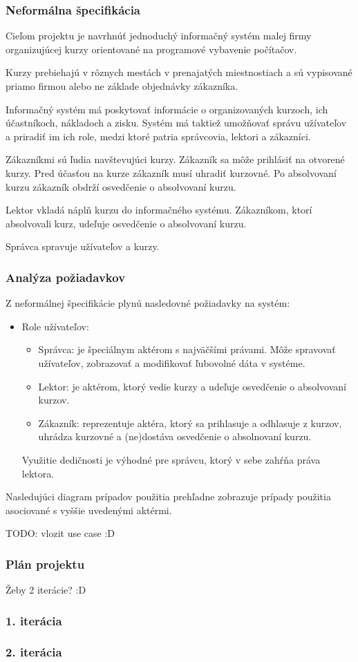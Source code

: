 \documentclass[12pt,a4paper,titlepage,final]{report}
\begin{document}
	\def\authora{Michal Riša}
	\def\authorb{Pavel Macenauer}
	\def\emaila{xrisam01@stud.fit.vutbr.cz}
	\def\emailb{xmacen02@stud.fit.vutbr.cz}
	\def\docname{Firma2}
	\def\projname{Prvotná analýza a plán projektu}
	
	\newpage
	\pagestyle{plain}
	\setcounter{page}{1}
	\subsubsection{Neformálna špecifikácia}
Cieľom projektu je navrhnúť jednoduchý informačný systém malej firmy organizujúcej kurzy orientované na programové vybavenie počítačov.

Kurzy prebiehajú v rôznych mestách v prenajatých miestnostiach a sú vypisované priamo firmou alebo ne základe objednávky zákazníka.

Informačný systém má poskytovať informácie o organizovaných kurzoch, ich účastníkoch, nákladoch a zisku. Systém má taktiež umožňovať správu užívateľov a priradiť im ich role, medzi ktoré patria správcovia, lektori a zákazníci.

Zákazníkmi sú ľudia navštevujúci kurzy. Zákazník sa môže prihlásiť na otvorené kurzy. Pred účasťou na kurze zákazník musí uhradiť kurzovné. Po absolvovaní kurzu zákazník obdrží osvedčenie o absolvovaní kurzu.

Lektor vkladá náplň kurzu do informačného systému. Zákazníkom, ktorí absolvovali kurz, udeľuje osvedčenie o absolvovaní kurzu.

Správca spravuje užívateľov a kurzy.
	\subsubsection{Analýza požiadavkov}
Z neformálnej špecifikácie plynú nasledovné požiadavky na systém:
		\begin{itemize}
			\item Role užívateľov:
			\begin{itemize}
				\item Správca: je špeciálnym aktérom s najväčšími právami. Môže spravovať užívateľov, zobrazovať a modifikovať ľubovolné dáta v systéme.
				\item Lektor: je aktérom, ktorý vedie kurzy a udeľuje osvedčenie o absolvovaní kurzov.
				\item Zákazník: reprezentuje aktéra, ktorý sa prihlasuje a odhlasuje z kurzov, uhrádza kurzovné a (ne)dostáva osvedčenie o absolnovaní kurzu.
			\end{itemize}
Využitie dedičnosti je výhodné pre správcu, ktorý v sebe zahŕňa práva lektora.
		\end{itemize}
Nasledujúci diagram prípadov použitia prehľadne zobrazuje prípady použitia asociované s vyššie uvedenými aktérmi.

TODO: vlozit use case :D
	\subsubsection{Plán projektu}
Žeby 2 iterácie? :D
	\subsubsection{1. iterácia}
	\subsubsection{2. iterácia}
\end{document}
